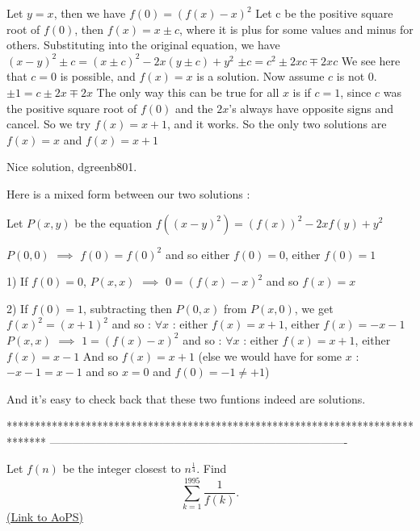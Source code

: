 \begin{solution}
	Let $ y=x$, then we have
$ f(0)=(f(x)-x)^2$
Let c be the positive square root of $ f(0)$, then $ f(x)=x \pm c$, where it is plus for some values and minus for others. Substituting into the original equation, we have
$ (x-y)^2 \pm c = (x \pm c)^2 - 2x(y \pm c)+y^2$
$ \pm c=c^2 \pm 2xc \mp 2xc$
We see here that $ c=0$ is possible, and $ f(x)=x$ is a solution. Now assume $ c$ is not $ 0$.
$ \pm 1=c \pm2x \mp 2x$
The only way this can be true for all $ x$ is if $ c=1$, since $ c$ was the positive square root of $ f(0)$ and the $ 2x$'s always have opposite signs and cancel. So we try $ f(x)=x+1$, and it works. 
So the only two solutions are $ f(x)=x$ and $ f(x)=x+1$
\end{solution}



\begin{solution}
	Nice solution, dgreenb801.

Here is a mixed form between our two solutions  :

Let $ P(x,y)$ be the equation $ f((x - y)^2) = (f(x))^2 - 2xf(y) + y^2$

$ P(0,0)$ $ \implies$ $ f(0) = f(0)^2$ and so either $ f(0) = 0$, either $ f(0) = 1$

1) If $ f(0) = 0$, $ P(x,x)$ $ \implies$ $ 0 = (f(x) - x)^2$ and so $ f(x) = x$

2) If $ f(0) = 1$, subtracting then $ P(0,x)$ from $ P(x,0)$, we get $ f(x)^2 = (x + 1)^2$ and so : $ \forall x$ : either $ f(x) = x + 1$, either $ f(x) = - x - 1$
$ P(x,x)$ $ \implies$ $ 1 = (f(x) - x)^2$ and so : $ \forall x$ : either $ f(x) = x + 1$, either $ f(x) = x - 1$
And so $ f(x) = x + 1$ (else we would have for some $ x$ : $ - x - 1 = x - 1$ and so $ x = 0$ and $ f(0) = - 1\ne + 1$)

And it's easy to check back that these two funtions indeed are solutions.
\end{solution}
*******************************************************************************
-------------------------------------------------------------------------------

\begin{problem}
	Let $ f(n)$ be the integer closest to $ n^{\frac{1}{4}}$. Find \[ \sum_{k=1}^{1995} \frac{1}{f(k)}.\]
	\flushright \href{https://artofproblemsolving.com/community/c6h312166}{(Link to AoPS)}
\end{problem}



